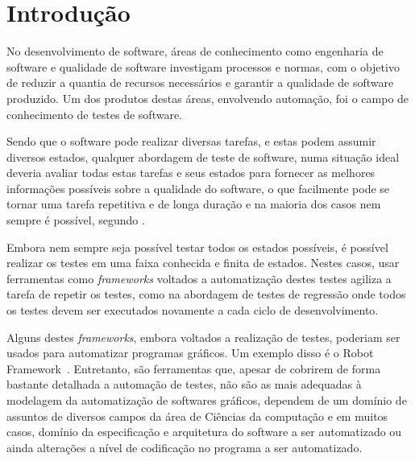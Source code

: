 \documentclass[12pt]{article}
\begin{document}
	\section{Introdução}
	
	No desenvolvimento de software, áreas de conhecimento como engenharia de software e qualidade de software
investigam processos e normas, com o objetivo de reduzir a quantia de recursos necessários e garantir a qualidade de
software produzido. Um dos produtos destas áreas, envolvendo automação, foi o campo de conhecimento de testes de software.

Sendo que o software pode realizar diversas tarefas, e estas podem assumir diversos estados, qualquer abordagem
de teste de software, numa situação ideal deveria avaliar todas estas tarefas e seus estados para fornecer as melhores
informações possíveis sobre a qualidade do software, o que facilmente pode se tornar uma tarefa repetitiva e de longa
duração e na maioria dos casos nem sempre é possível, segundo \cite[pag. 10]{myers2011art}.
 
Embora nem sempre seja possível testar todos os estados possíveis, é possível realizar os testes em uma faixa
conhecida e finita de estados. Nestes casos, usar ferramentas como \emph{frameworks} voltados a automatização destes testes
agiliza a tarefa de repetir os testes, como na abordagem de testes de regressão onde todos os testes devem ser
executados novamente a cada ciclo de desenvolvimento. 


Alguns destes \emph{frameworks}, embora voltados a realização de testes, poderiam ser usados para automatizar programas gráficos. Um exemplo disso é o Robot Framework~\cite{robotFW}. Entretanto, são ferramentas que, apesar de cobrirem de forma bastante detalhada a automação de testes, não são as mais adequadas à modelagem da automatização de softwares gráficos, dependem de um domínio de assuntos de diversos campos da área de Ciências da computação e em muitos casos, domínio da especificação e arquitetura do software a ser automatizado ou ainda alterações a nível de codificação no programa a ser automatizado.
\end{document}
